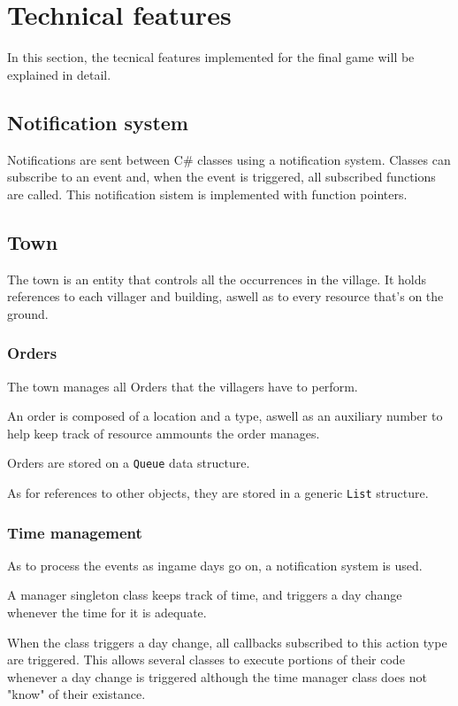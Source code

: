 \section{Technical features}

In this section, the tecnical features implemented for the final
game will be explained in detail.

\subsection{Notification system}

Notifications are sent between C\# classes using a notification
system. Classes can subscribe to an event and, when the event is
triggered, all subscribed functions are called. This notification
sistem is implemented with function pointers.

\subsection{Town}

The town is an entity that controls all the occurrences in the village.
It holds references to each villager and building, aswell as to every
resource that's on the ground.

\subsubsection{Orders}

The town manages all Orders that the villagers have to perform.

An order is composed of a location and a type, aswell as an auxiliary
number to help keep track of resource ammounts the order manages.

Orders are stored on a \texttt{Queue} data structure.

As for references to other objects, they are stored in a generic 
\texttt{List} structure.

\subsubsection{Time management}

As to process the events as ingame days go on, a notification system is used.

A manager \gls{singleton}
class keeps track of time, and triggers a day change whenever the time for
it is adequate.

When the class triggers a day change, all callbacks subscribed to this
action type are triggered. This allows several classes to execute portions
of their code whenever a day change is triggered although the time manager
class does not "know" of their existance.

